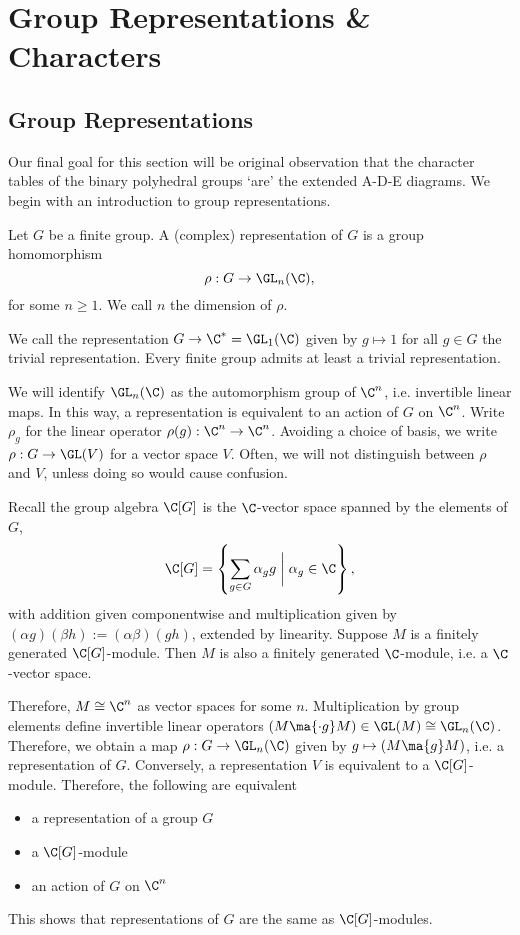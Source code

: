 \newpage
\section{Group Representations \& Characters}
\subsection{Group Representations}

Our final goal for this section will be \mc original observation that the character tables of the binary polyhedral groups `are' the extended A-D-E diagrams. We begin with an introduction to group representations.


\begin{dfn}[Representation]
Let $G$ be a finite group. A (complex) representation of $G$ is a group homomorphism
	\[
	\rho: G \to \GL_n(\C),
	\]
for some $n \geq 1$. We call $n$ the dimension of $\rho$. 
\end{dfn}


\begin{rem}
We call the representation $G \to \C^*=\GL_1(\C)$ given by $g \mapsto 1$ for all $g \in G$ the trivial representation. Every finite group admits at least a trivial representation.
\end{rem}


We will identify $\GL_n(\C)$ as the automorphism group of $\C^n$, i.e. invertible linear maps. In this way, a representation is equivalent to an action of $G$ on $\C^n$. Write $\rho_g$ for the linear operator $\rho(g): \C^n \to \C^n$. Avoiding a choice of basis, we write $\rho: G \to \GL(V)$ for a vector space $V$. Often, we will not distinguish between $\rho$ and $V$, unless doing so would cause confusion. 


Recall the group algebra $\C[G]$ is the $\C$-vector space spanned by the elements of $G$,
	\[
	\C[G]= \left\{ \sum_{g \in G} \alpha_g g \;\bigg|\; \alpha_g \in \C \right\},
	\]
with addition given componentwise and multiplication given by $(\alpha g)(\beta h):=(\alpha\beta)(gh)$, extended by linearity. Suppose $M$ is a finitely generated $\C[G]$-module. Then $M$ is also a finitely generated $\C$-module, i.e. a $\C$-vector space. 


Therefore, $M \cong \C^n$ as vector spaces for some $n$. Multiplication by group elements define invertible linear operators $(M \ma{\cdot g} M) \in \GL(M)\cong\GL_n(\C)$. Therefore, we obtain a map $\rho: G \to \GL_n(\C)$ given by $g \mapsto (M \ma{g} M)$, i.e. a representation of $G$. Conversely, a representation $V$ is equivalent to a $\C[G]$-module. Therefore, the following are equivalent
	\begin{itemize}
	\item a representation of a group $G$
	\item a $\C[G]$-module
	\item an action of $G$ on $\C^n$
	\end{itemize}
This shows that representations of $G$ are the same as $\C[G]$-modules. 


